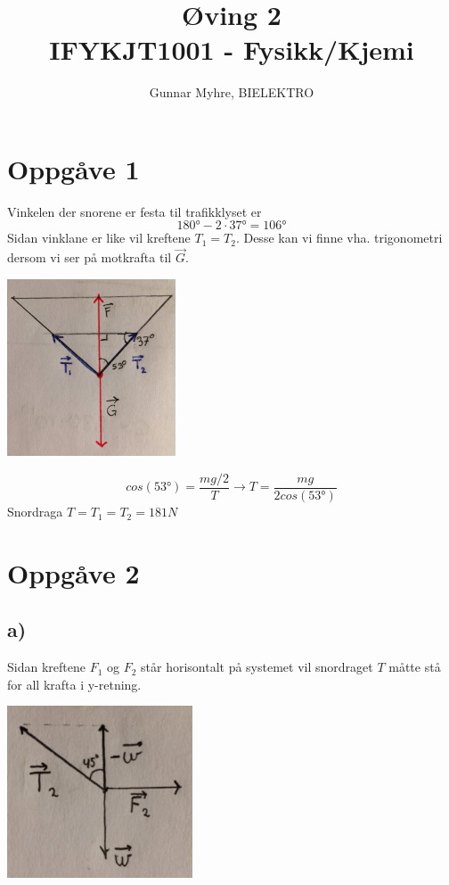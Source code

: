 \documentclass[12pt,a4paper]{article}
\title{%
  Øving 2 \\
  \large IFYKJT1001 - Fysikk/Kjemi \\
  }
\author{Gunnar Myhre, BIELEKTRO}
\begin{document}
  \maketitle

  \section*{Oppgåve 1}
    Vinkelen der snorene er festa til trafikklyset er
    \begin{equation}
      \ang{180}  - 2\cdot \ang{37} = \ang{106}
    \end{equation}
    Sidan vinklane er like vil kreftene $T_1 = T_2$. Desse kan vi finne vha. 
    trigonometri dersom vi ser på motkrafta til $\vec{G}$.

    \begin{center}
      \includegraphics[width=50mm]{02_01}
    \end{center}
    \begin{equation}
      cos(\ang{53}) = \frac{mg/2}{T}
      \rightarrow T = \frac{mg}{2cos(\ang{53})}
    \end{equation}
    Snordraga $T = T_1 = T_2 = 181 N$

  \newpage

  \section*{Oppgåve 2}
    \subsection*{a)}
    Sidan kreftene $F_1$ og $F_2$ står horisontalt på systemet vil snordraget
    $T$ måtte stå for all krafta i y-retning.

    \begin{center}
      \includegraphics[width=55mm]{02_02a}
    \end{center}
\end{document}

